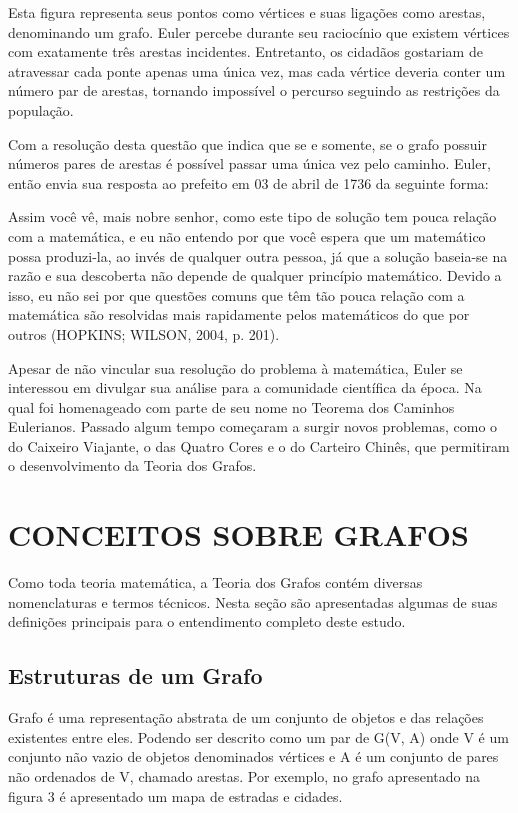 Esta figura representa seus pontos como vértices e suas ligações como arestas, denominando um grafo. Euler percebe durante seu raciocínio que existem vértices com exatamente três arestas incidentes. Entretanto, os cidadãos gostariam de atravessar cada ponte apenas uma única vez, mas cada vértice deveria conter um número par de arestas, tornando impossível o percurso seguindo as restrições da população.

Com a resolução desta questão que indica que se e somente, se o grafo possuir números pares de arestas é possível passar uma única vez pelo caminho. Euler, então envia sua resposta ao prefeito em 03 de abril de 1736 da seguinte forma:

\begin{citacaodireta}
Assim você vê, mais nobre senhor, como este tipo de solução tem pouca relação com a matemática, e eu não entendo por que você espera que um matemático possa produzi-la, ao invés de qualquer outra pessoa, já que a solução baseia-se na razão e sua descoberta não depende de qualquer princípio matemático. Devido a isso, eu não sei por que questões comuns que têm tão pouca relação com a matemática são resolvidas mais rapidamente pelos matemáticos do que por outros (HOPKINS; WILSON, 2004, p. 201).
\end{citacaodireta}

Apesar de não vincular sua resolução do problema à matemática, Euler se interessou em divulgar sua análise para a comunidade científica da época. Na qual foi homenageado com parte de seu nome no Teorema dos Caminhos Eulerianos. Passado algum tempo começaram a surgir novos problemas, como o do Caixeiro Viajante, o das Quatro Cores e o do Carteiro Chinês, que permitiram o desenvolvimento da Teoria dos Grafos.

\section{\esp CONCEITOS SOBRE GRAFOS}

Como toda teoria matemática, a Teoria dos Grafos contém diversas nomenclaturas e termos técnicos. Nesta seção são apresentadas algumas de suas definições principais para o entendimento completo deste estudo.

\subsection{\esp Estruturas de um Grafo}

Grafo é uma representação abstrata de um conjunto de objetos e das relações existentes entre eles. Podendo ser descrito como um par de G(V, A) onde V é um conjunto não vazio de objetos denominados vértices e A é um conjunto de pares não ordenados de V, chamado arestas. Por exemplo, no grafo apresentado na figura 3 é apresentado um mapa de estradas e cidades.

